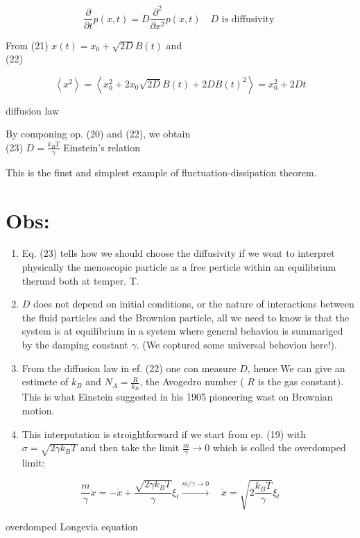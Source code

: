 \documentclass[10pt]{article}
\begin{document}
$$
\frac{\partial}{\partial t} p(x, t)=D \frac{\partial^{2}}{\partial x^{2}} p(x, t) \quad D \text { is diffusivity }
$$

From (21) $x(t)=x_{0}+\sqrt{2 D} B(t)$ and\\
(22)

$$
\left\langle x^{2}\right\rangle=\left\langle x_{0}^{2}+2 x_{0} \sqrt{2 D} B(t)+2 D B(t)^{2}\right\rangle=x_{0}^{2}+2 D t
$$

diffusion law

By componing op. (20) and (22), we obtain\\
(23) $D=\frac{k_{B} T}{\gamma}$ Einstein's relation

This is the finst and simplest example of fluctuation-dissipation theorem.

\section*{Obs:}
\begin{enumerate}
  \item Eq. (23) tells how we should choose the diffusivity if we wont to interpret physically the menoscopic particle as a free perticle within an equilibrium therund both at temper. T.
  \item $D$ does not depend on initial conditions, or the nature of interactions between the fluid particles and the Brownion particle, all we need to know is that the system is at equilibrium in a system where general behaviou is summariged by the damping constant $\gamma$. (We coptured some universal behovion here!).
  \item From the diffusion law in ef. (22) one con measure $D$, hence We can give an estimete of $k_{B}$ and $N_{A}=\frac{R}{k_{B}}$, the Avogedro number ( $R$ is the gas constant). This is what Einstein suggested in his 1905 pioneering wast on Brownian motion.
  \item This interputation is stroightforward if we start from ep. (19) with $\sigma=\sqrt{2 \gamma k_{B} T}$ and then take the limit $\frac{m}{\gamma} \rightarrow 0$ which is colled the overdomped limit:
\end{enumerate}

$$
\frac{m}{\gamma} \ddot{x}=-\dot{x}+\frac{\sqrt{2 \gamma k_{B} T}}{\gamma} \xi_{t} \xrightarrow{m / \gamma \rightarrow 0} \quad \dot{x}=\sqrt{2 \frac{k_{B} T}{\gamma}} \xi_{t}
$$

overdomped Longevia equation
\end{document}
